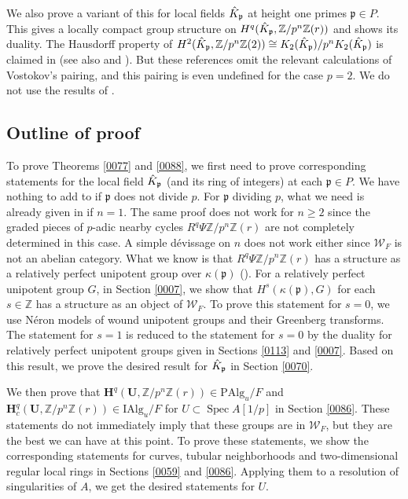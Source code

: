 \documentclass{amsart}
\theoremstyle{remark}
\numberwithin{equation}{section}
\newcommand{\Z}{\mathbb{Z}}
\newcommand{\Alg}{\mathrm{Alg}}
\newcommand{\Ind}{\mathrm{I}}
\newcommand{\Pro}{\mathrm{P}}
\newcommand{\alg}[1]{\mathbf{#1}}
\newcommand{\ideal}[1]{\mathfrak{#1}}
\DeclareMathOperator{\Spec}{Spec}
\begin{document}
We also prove a variant of this for local fields $\Hat{K}_{\ideal{p}}$
at height one primes $\ideal{p} \in P$.
This gives a locally compact group structure on
$H^{q}(\Hat{K}_{\ideal{p}}, \Z / p^{n} \Z(r))$ and shows its duality.
The Hausdorff property of
$H^{2}(\Hat{K}_{\ideal{p}}, \Z / p^{n} \Z(2)) \cong K_{2}(\Hat{K}_{\ideal{p}}) / p^{n} K_{2}(\Hat{K}_{\ideal{p}})$
is claimed in \cite[Section 4.3]{Fes01}
(see also \cite[Theorem 4.7]{Fes01} and \cite[Section 6.6, Theorem 3]{Fes00}).
But these references omit the relevant calculations of Vostokov's pairing,
and this pairing is even undefined for the case $p = 2$.
We do not use the results of \cite{Fes00, Fes01}.


\subsection{Outline of proof}

To prove Theorems \ref{0077} and \ref{0088},
we first need to prove corresponding statements for
the local field $\Hat{K}_{\ideal{p}}$ (and its ring of integers) at each $\ideal{p} \in P$.
We have nothing to add to \cite[Section 7]{Suz24} if $\ideal{p}$ does not divide $p$.
For $\ideal{p}$ dividing $p$,
what we need is already given in
\cite[Proposition 6.4.1 and the proof of Proposition 6.5.2]{Suz24}
if $n = 1$.
The same proof does not work for $n \ge 2$
since the graded pieces of $p$-adic nearby cycles $R^{q} \Psi \Z / p^{n} \Z(r)$ are not completely determined in this case.
A simple d\'evissage on $n$ does not work either
since $\mathcal{W}_{F}$ is not an abelian category.
What we know is that $R^{q} \Psi \Z / p^{n} \Z(r)$ has a structure
as a relatively perfect unipotent group over $\kappa(\ideal{p})$ (\cite{BS20}).
For a relatively perfect unipotent group $G$, in Section \ref{0007},
we show that $H^{s}(\kappa(\ideal{p}), G)$ for each $s \in \Z$ has a structure
as an object of $\mathcal{W}_{F}$.
To prove this statement for $s = 0$,
we use N\'eron models of wound unipotent groups and their Greenberg transforms.
The statement for $s = 1$ is reduced to the statement for $s = 0$
by the duality for relatively perfect unipotent groups given in Sections \ref{0113} and \ref{0007}.
Based on this result, we prove the desired result for $\Hat{K}_{\ideal{p}}$
in Section \ref{0070}.

We then prove that $\alg{H}^{q}(\alg{U}, \Z / p^{n} \Z(r)) \in \Pro \Alg_{u} / F$
and $\alg{H}^{q}_{c}(\alg{U}, \Z / p^{n} \Z(r)) \in \Ind \Alg_{u} / F$
for $U \subset \Spec A[1 / p]$
in Section \ref{0086}.
These statements do not immediately imply that these groups are in $\mathcal{W}_{F}$,
but they are the best we can have at this point.
To prove these statements,
we show the corresponding statements for
curves, tubular neighborhoods and two-dimensional regular local rings
in Sections \ref{0059} and \ref{0086}.
Applying them to a resolution of singularities of $A$,
we get the desired statements for $U$.
\end{document}
